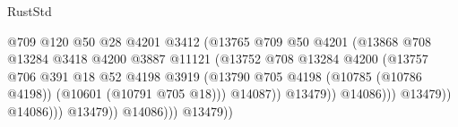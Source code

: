\begin{lexlean}{RustStd}
\begin{coremodule}
                                                      @709
                                                      @120
                                                      @50
                                                      @28
                                                      @4201
                                                      @3412
                                                      (@13765
                                                        @709
                                                        @50
                                                        @4201
                                                        (@13868
                                                          @708
                                                          @13284
                                                          @3418
                                                          @4200
                                                          @3887
                                                          @11121
                                                          (@13752
                                                            @708
                                                            @13284
                                                            @4200
                                                            (@13757
                                                              @706
                                                              @391
                                                              @18
                                                              @52
                                                              @4198
                                                              @3919
                                                              (@13790
                                                                @705
                                                                @4198
                                                                (@10785 (@10786 @4198))
                                                                (@10601 (@10791 @705 @18)))
                                                              @14087))
                                                          @13479))
                                                      @14086)))
                                                @13479))
                                            @14086)))
                                      @13479))
                                  @14086)))
                            @13479))

\end{coremodule}
\end{lexlean}
